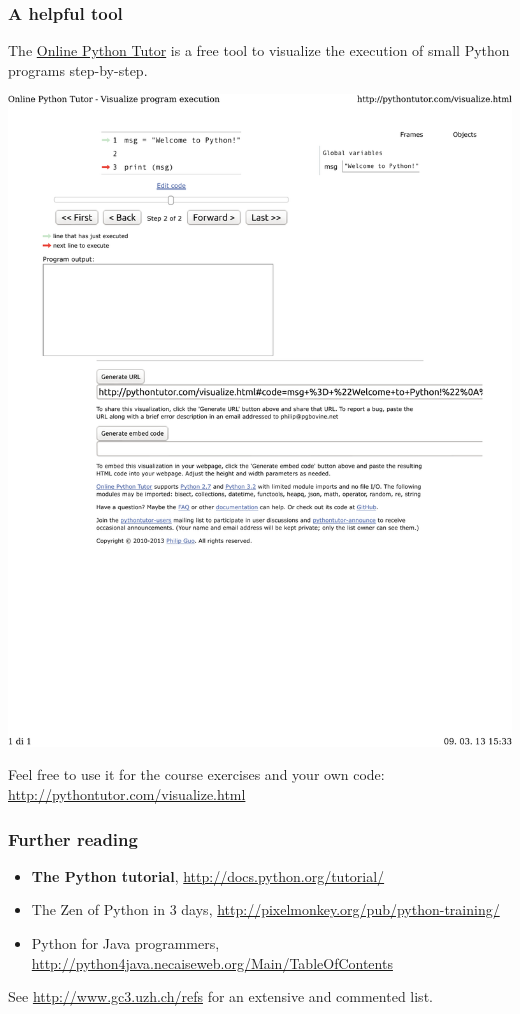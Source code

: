 \documentclass[english,serif,mathserif,xcolor=pdftex,dvipsnames,table]{beamer}
\begin{document}
\begin{frame}
  \frametitle{A helpful tool}

  The \href{http://pythontutor.com}{Online Python Tutor} is a free
  tool to visualize the execution of small Python programs
  step-by-step.

  \+
  \href{http://tinyurl.com/cf5ftwr}{%
    \centering
    \includegraphics[width=1.0\linewidth,viewport=0 600 500 750,clip]{fig/pythontutor}
  }

  \+ Feel free to use it for the course exercises and your own code:
  \url{http://pythontutor.com/visualize.html}
\end{frame}

\begin{frame}
  \frametitle{Further reading}

  \begin{itemize}
    \item \textbf{The Python tutorial},
      {\small \url{http://docs.python.org/tutorial/}}
    \item {The Zen of Python in 3 days},
      {\small \url{http://pixelmonkey.org/pub/python-training/}}
    \item {Python for Java programmers},
      {\small \url{http://python4java.necaiseweb.org/Main/TableOfContents}}
  \end{itemize}

  \+
  See {\small\url{http://www.gc3.uzh.ch/refs}}
  for an extensive and commented list.

\end{frame}
\end{document}
